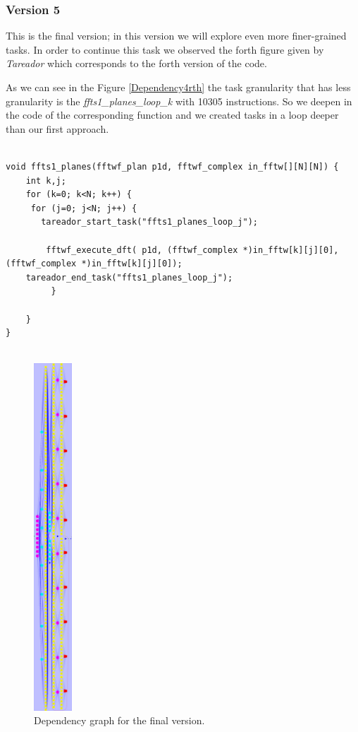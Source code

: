 \documentclass[12]{article}
\begin{document}
\subsubsection{Version 5}
This is the final version; in this version we will explore even more finer-grained tasks. In order to continue this task we observed the forth figure given by \textit{Tareador} which corresponds to the forth version of the code. 

As we can see in the Figure \ref{Dependency4rth} the task granularity that has less granularity is the \textit{ffts1\_planes\_loop\_k} with 10305 instructions. So we deepen in the code of the corresponding function and we created tasks in a loop deeper than our first approach. 
\begin{lstlisting}

void ffts1_planes(fftwf_plan p1d, fftwf_complex in_fftw[][N][N]) {
    int k,j;
    for (k=0; k<N; k++) {
     for (j=0; j<N; j++) {
       tareador_start_task("ffts1_planes_loop_j");

        fftwf_execute_dft( p1d, (fftwf_complex *)in_fftw[k][j][0], (fftwf_complex *)in_fftw[k][j][0]);
    tareador_end_task("ffts1_planes_loop_j");
         }

    }
}


\end{lstlisting}
\bigskip

\begin{figure}[H]
\centering  \includegraphics[width=\linewidth , height=13cm, width=4cm  ]{images/dependency_graph5.png}
  \caption{Dependency graph for the final version.}
  \label{fig:Dependency5}
\end{figure}
\end{document}
